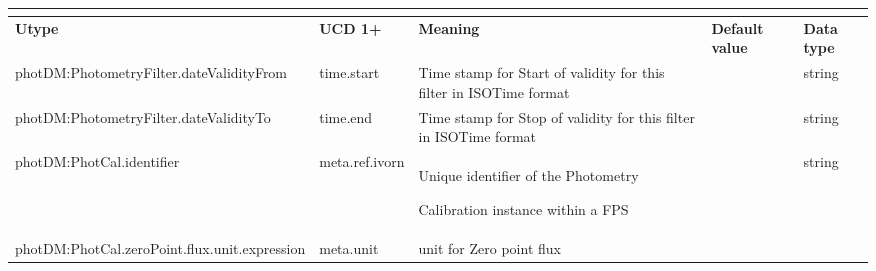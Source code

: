 \documentclass[11pt,a4paper]{ivoa}
\begin{document}
\begin{table}[H]
\centering
\begin{adjustbox}{angle=90} 
\begin{tabular}{p{3in}p{0.87in}p{2in}p{1in}p{0.25in}}
\multicolumn{5}{p{\dimexpr6.59in+8\tabcolsep\relax}}{\centering {\fontsize{10pt}{12.0pt}\selectfont \textbf{PhotCal Metadata}}} \\
\hline
\multicolumn{1}{p{3in}}{{\fontsize{8pt}{8pt}\selectfont \textbf{Utype}}} & 
\multicolumn{1}{p{0.87in}}{{\fontsize{8pt}{8pt}\selectfont \textbf{UCD 1+}}} & 
\multicolumn{1}{p{2in}}{{\fontsize{8pt}{8pt}\selectfont \textbf{Meaning}}} & 
\multicolumn{1}{p{1in}}{{\fontsize{8pt}{8pt}\selectfont \textbf{Default value}}} & 
\multicolumn{1}{p{0.25in}}{{\fontsize{8pt}{8pt}\selectfont \textbf{Data type}}} \\
\hline
\multicolumn{1}{p{3in}}{{\fontsize{8pt}{8pt}\selectfont photDM:PhotometryFilter.dateValidityFrom}} & 
\multicolumn{1}{p{0.87in}}{{\fontsize{8pt}{8pt}\selectfont time.start}} & 
\multicolumn{1}{p{2in}}{{\fontsize{8pt}{8pt}\selectfont Time stamp for Start of validity for this filter in ISOTime format }} & 
\multicolumn{1}{p{1in}}{} & 
\multicolumn{1}{p{0.25in}}{{\fontsize{8pt}{8pt}\selectfont string }} \\
\hline
\multicolumn{1}{p{3in}}{{\fontsize{8pt}{8pt}\selectfont photDM:PhotometryFilter.dateValidityTo}} & 
\multicolumn{1}{p{0.87in}}{{\fontsize{8pt}{8pt}\selectfont time.end}} & 
\multicolumn{1}{p{2in}}{{\fontsize{8pt}{8pt}\selectfont Time stamp for Stop of validity for this filter in ISOTime format }} & 
\multicolumn{1}{p{1in}}{} & 
\multicolumn{1}{p{0.25in}}{{\fontsize{8pt}{8pt}\selectfont string }} \\
\hline
\multicolumn{1}{p{3in}}{{\fontsize{8pt}{8pt}\selectfont photDM:PhotCal.identifier}} & 
\multicolumn{1}{p{0.87in}}{{\fontsize{8pt}{8pt}\selectfont meta.ref.ivorn }} & 
\multicolumn{1}{p{2in}}{{\fontsize{8pt}{8pt}\selectfont Unique identifier of the Photometry } \par {\fontsize{8pt}{8pt}\selectfont Calibration instance within a FPS}} & 
\multicolumn{1}{p{1in}}{} & 
\multicolumn{1}{p{0.25in}}{{\fontsize{8pt}{8pt}\selectfont string}} \\
\hline
\multicolumn{1}{p{3in}}{{\fontsize{8pt}{8pt}\selectfont photDM:PhotCal.zeroPoint.flux.unit.expression}} & 
\multicolumn{1}{p{0.87in}}{{\fontsize{8pt}{8pt}\selectfont meta.unit }} & 
\multicolumn{1}{p{2in}}{{\fontsize{8pt}{8pt}\selectfont unit for Zero point flux}} & 

\end{tabular}
\end{adjustbox}
\end{table}
\end{document}
